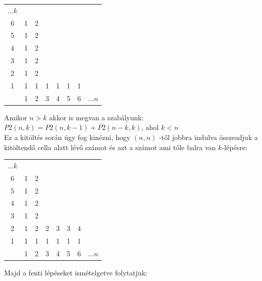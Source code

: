 \documentclass{article}
\theoremstyle{mytheoremstyle}
\theoremstyle{mytheoremstyle}
\theoremstyle{myproblemstyle}
\begin{document}
\begin{center}
    \begin{tabular}{c|ccccccc}
        $\ldots k$\\
        6&1&2\\
        5&1&2\\
        4&1&2\\
        3&1&2\\
        2&1&2\\
        1&1&1&1&1&1&1\\
        \midrule&1&2&3&4&5&6& $\ldots n$ \\
    \end{tabular}
\end{center}
Amikor $n>k$ akkor is megvan a szabályunk:\\
$P2(n,k) = P2(n,k-1) + P2(n-k,k)\text{, ahol }k<n$\\
Ez a kitöltés során úgy fog kinézni, hogy $(n,n)$ -től jobbra 
indulva összeadjuk a kitöltendő cella alatt lévő számot és azt 
a számot ami tőle balra van $k$-lépésre:

\begin{center}
    \begin{tabular}{c|ccccccc}
        $\ldots k$\\
        6&1&2\\
        5&1&2\\
        4&1&2\\
        3&1&2\\
        2&1&2&2&3&3&4\\
        1&1&1&1&1&1&1\\
        \midrule&1&2&3&4&5&6& $\ldots n$ \\
    \end{tabular}
\end{center}

Majd a fenti lépéseket ismételgetve folytatjuk:
\end{document}
